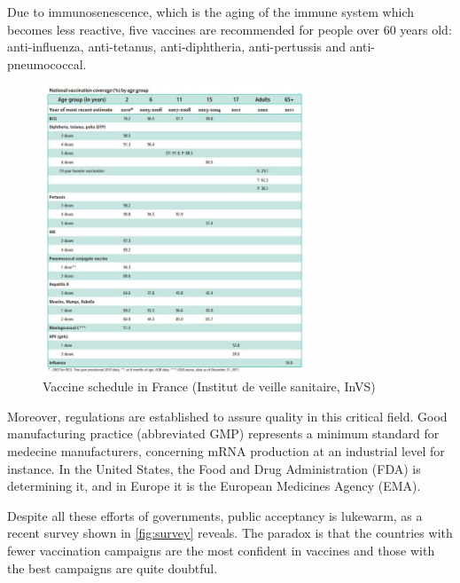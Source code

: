 \documentclass{article}
\begin{document}
            Due to immunosenescence, which is the aging of the immune system which becomes less reactive, five vaccines are recommended
                for people over 60 years old: anti-influenza, anti-tetanus, anti-diphtheria, anti-pertussis and anti-pneumococcal.

            \begin{figure}
                \centering
                \includegraphics[width=0.7\textwidth]{imgs/VaccineSchedule.JPG}
                \caption{Vaccine schedule in France (Institut de veille sanitaire, InVS) \autocite{spfAssessmentVaccinationCoverage}}
                \label{fig:vacAgenda}
            \end{figure}

            Moreover, regulations are established to assure quality in this critical field.
                Good manufacturing practice (abbreviated GMP) represents a minimum standard for medecine manufacturers,
                concerning mRNA production at an industrial level for instance. In the United States, the Food and Drug Administration (FDA) is determining it, and in Europe
                it is the European Medicines Agency (EMA).

            Despite all these efforts of governments, public acceptancy is lukewarm, as a recent survey shown in \ref{fig:survey} reveals.
            The paradox is that the countries with fewer vaccination campaigns are the most confident in vaccines and those with the best campaigns are quite doubtful.          
                    
\end{document}
